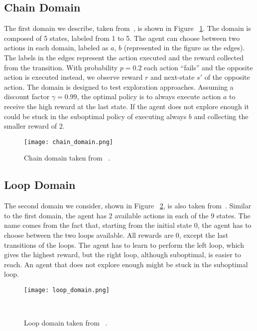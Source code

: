\subsection{Chain Domain}
The first domain we describe, taken from~\cite{Dearden98bayesianq-learning}, is shown in Figure ~\ref{fig:chain_domain}. The domain is composed of 5 states, labeled from 1 to 5. The agent can choose between two actions in each domain, labeled as $a$, $b$ (represented in the figure as the edges). The labels in the edges represent the action executed and the reward collected from the transition. With probability $p=0.2$ each action ``fails'' and the opposite action is executed instead, \ie we observe reward $r$ and next-state $s'$ of the opposite action. The domain is designed to test exploration approaches. Assuming a discount factor $\gamma=0.99$, the optimal policy is to always execute action $a$ to receive the high reward at the last state. If the agent does not explore enough it could be stuck in the suboptimal policy of executing always $b$ and collecting the smaller reward of 2.
\begin{figure}
 \texttt{[image: chain\_domain.png]}
 \caption{Chain domain taken from ~\cite{Dearden98bayesianq-learning}.}
 \label{fig:chain_domain}
\end{figure}
\subsection{Loop Domain}
The second domain we consider, shown in Figure ~\ref{fig:loop_domain}, is also taken from~\cite{Dearden98bayesianq-learning}. Similar to the first domain, the agent has 2 available actions in each of the 9 states. The name comes from the fact that, starting from the initial state 0, the agent has to choose between the two loops available. All rewards are 0, except the last transitions of the loops. The agent has to learn to perform the left loop, which gives the highest reward, but the right loop, although suboptimal, is easier to reach. An agent that does not explore enough might be stuck in the suboptimal loop.
\begin{figure}
 \texttt{[image: loop\_domain.png]}
 \caption{Loop domain taken from ~\cite{Dearden98bayesianq-learning}.} ~
 \label{fig:loop_domain}
\end{figure}
